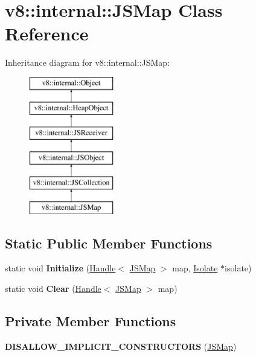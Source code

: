 \hypertarget{classv8_1_1internal_1_1_j_s_map}{}\section{v8\+:\+:internal\+:\+:J\+S\+Map Class Reference}
\label{classv8_1_1internal_1_1_j_s_map}
Inheritance diagram for v8\+:\+:internal\+:\+:J\+S\+Map\+:\begin{figure}[H]
\begin{center}
\leavevmode
\includegraphics[height=6.000000cm]{classv8_1_1internal_1_1_j_s_map}
\end{center}
\end{figure}
\subsection*{Static Public Member Functions}
\begin{DoxyCompactItemize}
\item 
static void {\bfseries Initialize} (\hyperlink{classv8_1_1internal_1_1_handle}{Handle}$<$ \hyperlink{classv8_1_1internal_1_1_j_s_map}{J\+S\+Map} $>$ map, \hyperlink{classv8_1_1internal_1_1_isolate}{Isolate} $\ast$isolate)\hypertarget{classv8_1_1internal_1_1_j_s_map_a8311701adf455f220d3160150f0dae61}{}\label{classv8_1_1internal_1_1_j_s_map_a8311701adf455f220d3160150f0dae61}

\item 
static void {\bfseries Clear} (\hyperlink{classv8_1_1internal_1_1_handle}{Handle}$<$ \hyperlink{classv8_1_1internal_1_1_j_s_map}{J\+S\+Map} $>$ map)\hypertarget{classv8_1_1internal_1_1_j_s_map_a8751158714b9cef076d9369eeae0e809}{}\label{classv8_1_1internal_1_1_j_s_map_a8751158714b9cef076d9369eeae0e809}

\end{DoxyCompactItemize}
\subsection*{Private Member Functions}
\begin{DoxyCompactItemize}
\item 
{\bfseries D\+I\+S\+A\+L\+L\+O\+W\+\_\+\+I\+M\+P\+L\+I\+C\+I\+T\+\_\+\+C\+O\+N\+S\+T\+R\+U\+C\+T\+O\+RS} (\hyperlink{classv8_1_1internal_1_1_j_s_map}{J\+S\+Map})\hypertarget{classv8_1_1internal_1_1_j_s_map_a9a9401acb345b94c0925423458096496}{}\label{classv8_1_1internal_1_1_j_s_map_a9a9401acb345b94c0925423458096496}

\end{DoxyCompactItemize}
